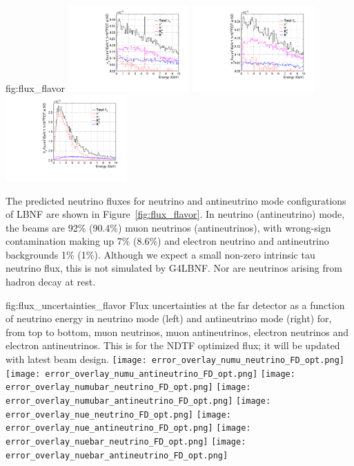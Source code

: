 \begin{dunefigure}{fig:flux_flavor}
     \includegraphics[width=0.35\textwidth]{graphics/dune_antineutrino_nd_nue.pdf}
    \includegraphics[width=0.35\textwidth]{graphics/dune_neutrino_nd_nuebar.pdf}
     \includegraphics[width=0.35\textwidth]{graphics/dune_antineutrino_nd_nuebar.pdf}
\end{dunefigure}

The predicted neutrino fluxes for neutrino and antineutrino mode configurations of LBNF are shown in Figure~\ref{fig:flux_flavor}.  In neutrino (antineutrino) mode, the beams are 92\% (90.4\%) muon neutrinos (antineutrinos), with wrong-sign contamination making up 7\% (8.6\%) and electron neutrino and antineutrino backgrounds 1\% (1\%).  Although %
we expect a small non-zero intrinsic tau neutrino flux, this is not simulated by G4LBNF.  Nor are neutrinos arising from hadron decay at rest. %

\begin{dunefigure}{fig:flux_uncertainties_flavor}
{Flux uncertainties at the far detector as a function of neutrino energy in neutrino mode (left) and antineutrino mode (right) for, from top to bottom, muon neutrinos, muon antineutrinos, electron neutrinos and electron antineutrinos.   This is for the NDTF optimized flux; it will  be updated with latest beam design.   }
    \texttt{[image: error\_overlay\_numu\_neutrino\_FD\_opt.png]}
    \texttt{[image: error\_overlay\_numu\_antineutrino\_FD\_opt.png]}
    \texttt{[image: error\_overlay\_numubar\_neutrino\_FD\_opt.png]}
    \texttt{[image: error\_overlay\_numubar\_antineutrino\_FD\_opt.png]}
        \texttt{[image: error\_overlay\_nue\_neutrino\_FD\_opt.png]}
    \texttt{[image: error\_overlay\_nue\_antineutrino\_FD\_opt.png]}
        \texttt{[image: error\_overlay\_nuebar\_neutrino\_FD\_opt.png]}
    \texttt{[image: error\_overlay\_nuebar\_antineutrino\_FD\_opt.png]}
    \end{dunefigure}

